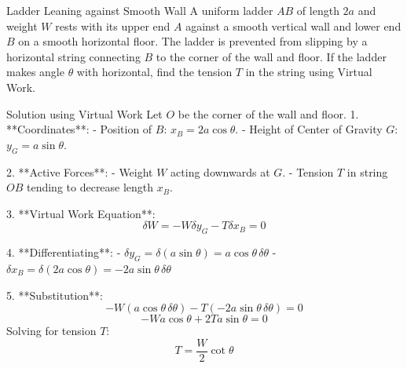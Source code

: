\documentclass[11pt,a4paper]{article}
\begin{document}
\begin{examplebox}{Ladder Leaning against Smooth Wall}
A uniform ladder $AB$ of length $2a$ and weight $W$ rests with its upper end $A$ against a smooth vertical wall and lower end $B$ on a smooth horizontal floor. The ladder is prevented from slipping by a horizontal string connecting $B$ to the corner of the wall and floor. If the ladder makes angle $\theta$ with horizontal, find the tension $T$ in the string using Virtual Work.
\end{examplebox}

\begin{center}
\end{center}

\begin{proofbox}{Solution using Virtual Work}
Let $O$ be the corner of the wall and floor.
1. **Coordinates**:
   - Position of $B$: $x_B = 2a \cos\theta$.
   - Height of Center of Gravity $G$: $y_G = a \sin\theta$.

2. **Active Forces**:
   - Weight $W$ acting downwards at $G$.
   - Tension $T$ in string $OB$ tending to decrease length $x_B$.

3. **Virtual Work Equation**:
   \begin{equation}
   \delta W = -W \delta y_G - T \delta x_B = 0
   \end{equation}

4. **Differentiating**:
   - $\delta y_G = \delta(a \sin\theta) = a \cos\theta \, \delta\theta$
   - $\delta x_B = \delta(2a \cos\theta) = -2a \sin\theta \, \delta\theta$

5. **Substitution**:
   \[
   -W (a \cos\theta \, \delta\theta) - T (-2a \sin\theta \, \delta\theta) = 0
   \]
   \[
   -W a \cos\theta + 2T a \sin\theta = 0
   \]
   Solving for tension $T$:
   \begin{equation}
   T = \frac{W}{2} \cot\theta
   \end{equation}
\end{proofbox}
\end{document}
